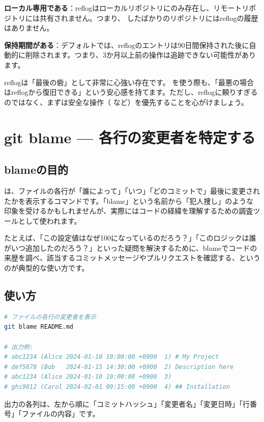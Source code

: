 \textbf{ローカル専用である}：reflogはローカルリポジトリにのみ存在し、リモートリポジトリには共有されません。つまり、 したばかりのリポジトリにはreflogの履歴はありません。

\textbf{保持期間がある}：デフォルトでは、reflogのエントリは90日間保持された後に自動的に削除されます。つまり、3か月以上前の操作は追跡できない可能性があります。

reflogは「最後の砦」として非常に心強い存在です。 を使う際も、「最悪の場合はreflogから復旧できる」という安心感を持てます。ただし、reflogに頼りすぎるのではなく、まずは安全な操作（ など）を優先することを心がけましょう。

\section{git blame — 各行の変更者を特定する}

\subsection{blameの目的}

 は、ファイルの各行が「誰によって」「いつ」「どのコミットで」最後に変更されたかを表示するコマンドです。「blame」という名前から「犯人捜し」のような印象を受けるかもしれませんが、実際にはコードの経緯を理解するための調査ツールとして使われます。

たとえば、「この設定値はなぜ100になっているのだろう？」「このロジックは誰がいつ追加したのだろう？」といった疑問を解決するために、blameでコードの来歴を調べ、該当するコミットメッセージやプルリクエストを確認する、というのが典型的な使い方です。

\subsection{使い方}

\begin{lstlisting}[language=bash]
# ファイルの各行の変更者を表示
git blame README.md

# 出力例:
# abc1234 (Alice 2024-01-10 10:00:00 +0900  1) # My Project
# def5678 (Bob   2024-01-15 14:30:00 +0900  2) Description here
# abc1234 (Alice 2024-01-10 10:00:00 +0900  3)
# ghi9012 (Carol 2024-02-01 09:15:00 +0900  4) ## Installation
\end{lstlisting}

出力の各列は、左から順に「コミットハッシュ」「変更者名」「変更日時」「行番号」「ファイルの内容」です。

